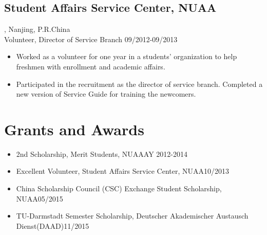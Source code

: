 \documentclass{article}
\begin{document}
\subsection{Student Affairs Service Center, NUAA}, Nanjing, P.R.China\\
Volunteer, Director of Service Branch \hfill09/2012-09/2013
\begin{itemize}[noitemsep,topsep=1pt]
\item Worked as a volunteer for one year in a students' organization to help freshmen with enrollment and academic affairs.
\item Participated in the recruitment as the director of service branch. Completed a new version of Service Guide for training the newcomers.   
\end{itemize}

\section{Grants and Awards}
\begin{itemize}[noitemsep,topsep=1pt]
\item 2nd Scholarship, Merit Students, NUAA\hfill AY 2012-2014
\item Excellent Volunteer, Student Affairs Service Center, NUAA\hfill 10/2013
\item China Scholarship Council (CSC) Exchange Student Scholarship, NUAA\hfill 05/2015
\item TU-Darmstadt Semester Scholarship, Deutscher Akademischer Austausch Dienst(DAAD)\hfill 11/2015
\end{itemize}
\end{document}
